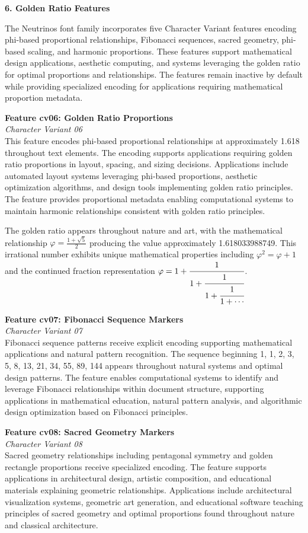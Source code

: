 \documentclass[11pt,letterpaper]{article}
\newcommand{\featurebox}[3]{%
\noindent
\colorbox{sectiongray}{%
\begin{minipage}{\dimexpr\textwidth-2\fboxsep}
\vspace{0.3em}
{\color{neutrinosblue}\large\textbf{#1}}\\[0.3em]
{\small\textit{#2}}\\[0.5em]
#3
\vspace{0.3em}
\end{minipage}}
\vspace{1em}
}
\newcommand{\sectionheader}[1]{%
\vspace{1em}
\noindent
\colorbox{neutrinosblue}{%
\begin{minipage}{\textwidth}
\vspace{0.3em}
{\color{white}\LARGE\textbf{#1}}
\vspace{0.3em}
\end{minipage}}
\vspace{0.5em}
}
\begin{document}
\newpage

\sectionheader{6. Golden Ratio Features}

The Neutrinos font family incorporates five Character Variant features encoding phi-based proportional relationships, Fibonacci sequences, sacred geometry, phi-based scaling, and harmonic proportions. These features support mathematical design applications, aesthetic computing, and systems leveraging the golden ratio for optimal proportions and relationships. The features remain inactive by default while providing specialized encoding for applications requiring mathematical proportion metadata.

\featurebox{Feature cv06: Golden Ratio Proportions}{Character Variant 06}{%
This feature encodes phi-based proportional relationships at approximately 1.618 throughout text elements. The encoding supports applications requiring golden ratio proportions in layout, spacing, and sizing decisions. Applications include automated layout systems leveraging phi-based proportions, aesthetic optimization algorithms, and design tools implementing golden ratio principles. The feature provides proportional metadata enabling computational systems to maintain harmonic relationships consistent with golden ratio principles.

The golden ratio appears throughout nature and art, with the mathematical relationship $\varphi = \frac{1 + \sqrt{5}}{2}$ producing the value approximately 1.618033988749. This irrational number exhibits unique mathematical properties including $\varphi^2 = \varphi + 1$ and the continued fraction representation $\varphi = 1 + \cfrac{1}{1 + \cfrac{1}{1 + \cfrac{1}{1 + \cdots}}}$.
}

\featurebox{Feature cv07: Fibonacci Sequence Markers}{Character Variant 07}{%
Fibonacci sequence patterns receive explicit encoding supporting mathematical applications and natural pattern recognition. The sequence beginning 1, 1, 2, 3, 5, 8, 13, 21, 34, 55, 89, 144 appears throughout natural systems and optimal design patterns. The feature enables computational systems to identify and leverage Fibonacci relationships within document structure, supporting applications in mathematical education, natural pattern analysis, and algorithmic design optimization based on Fibonacci principles.
}

\featurebox{Feature cv08: Sacred Geometry Markers}{Character Variant 08}{%
Sacred geometry relationships including pentagonal symmetry and golden rectangle proportions receive specialized encoding. The feature supports applications in architectural design, artistic composition, and educational materials explaining geometric relationships. Applications include architectural visualization systems, geometric art generation, and educational software teaching principles of sacred geometry and optimal proportions found throughout nature and classical architecture.
}
\end{document}
